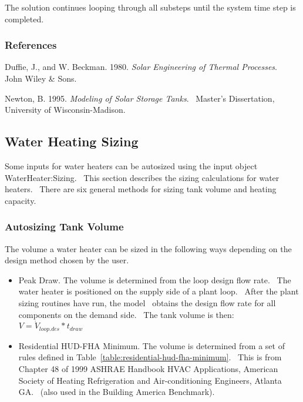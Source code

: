 The solution continues looping through all substeps until the system time step is completed.

\subsubsection{References}\label{references-1-017}

Duffie, J., and W. Beckman. 1980. \emph{Solar Engineering of Thermal Processes}.~ John Wiley \& Sons.

Newton, B. 1995. \emph{Modeling of Solar Storage Tanks}.~ Master's Dissertation, University of Wisconsin-Madison.

\subsection{Water Heating Sizing}\label{water-heating-sizing}

Some inputs for water heaters can be autosized using the input object WaterHeater:Sizing.~ This section describes the sizing calculations for water heaters.~ There are six general methods for sizing tank volume and heating capacity.

\subsubsection{Autosizing Tank Volume}\label{autosizing-tank-volume}

The volume a water heater can be sized in the following ways depending on the design method chosen by the user.

\begin{itemize}
  \item Peak Draw. The volume is determined from the loop design flow rate.~ The water heater is positioned on the supply side of a plant loop.~ After the plant sizing routines have run, the model~ obtains the design flow rate for all components on the demand side.~ The tank volume is then: \(V = {\dot V_{loop.des}}*{t_{draw}}\)

  \item Residential HUD-FHA Minimum. The volume is determined from a set of rules defined in Table~\ref{table:residential-hud-fha-minimum}.~ This is from Chapter 48 of 1999 ASHRAE Handbook HVAC Applications, American Society of Heating Refrigeration and Air-conditioning Engineers, Atlanta GA.~ (also used in the Building America Benchmark).
\end{itemize}

